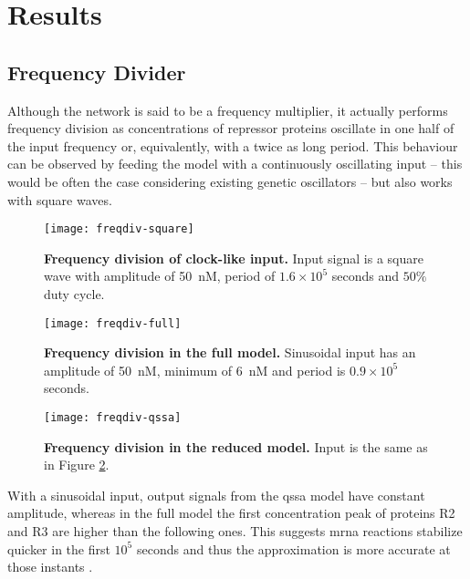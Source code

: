 \section{Results}

  \subsection{Frequency Divider}

    Although the network is said to be a frequency multiplier, it actually performs frequency division as concentrations of repressor proteins oscillate in one half of the input frequency or, equivalently, with a twice as long period.
    This behaviour can be observed by feeding the model with a continuously oscillating input -- this would be often the case considering existing genetic oscillators \cite{optoscillator} -- but also works with square waves.

    \begin{figure}[!htbp]
      \centering
      \texttt{[image: freqdiv-square]}
      \caption{\textbf{Frequency division of clock-like input.} Input signal is a square wave with amplitude of \SI{50}{\nano M}, period of $1.6 \times 10^5$ seconds and $50\%$ duty cycle.}
      \label{fig:freqdiv-square}
    \end{figure}

    \begin{figure}[!htbp]
      \centering
      \texttt{[image: freqdiv-full]}
      \caption{\textbf{Frequency division in the full model.} Sinusoidal input has an amplitude of \SI{50}{\nano M}, minimum of \SI{6}{\nano M} and period is $0.9 \times 10^5$ seconds.}
      \label{fig:freqdiv-full}
    \end{figure}

    \begin{figure}[!htbp]
      \centering
      \texttt{[image: freqdiv-qssa]}
      \caption{\textbf{Frequency division in the reduced model.} Input is the same as in Figure \ref{fig:freqdiv-full}.}
      \label{fig:freqdiv-qssa}
    \end{figure}

    With a sinusoidal input, output signals from the \ac{qssa} model have constant amplitude, whereas in the full model the first concentration peak of proteins R2 and R3 are higher than the following ones.
    This suggests \acs{mrna} reactions stabilize quicker in the first $10^5$ seconds and thus the approximation is more accurate at those instants \cite{ingalls}.

